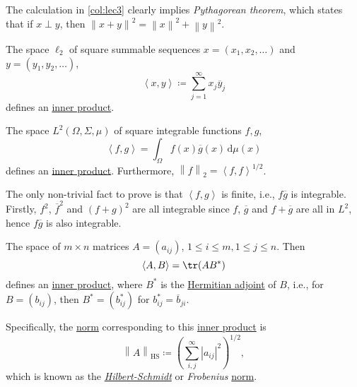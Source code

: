 \begin{remark}\label{rmk:Pythagorean-theorem}
	The calculation in \autoref{col:lec3} clearly implies \emph{Pythagorean theorem}, which states that if \(x \perp y\), then \(\left\lVert x + y\right\rVert ^{2} = \left\lVert x\right\rVert ^{2} + \left\lVert y\right\rVert ^{2} \).
\end{remark}

\begin{eg}
	The space \(\ell _2\) of square summable sequences \(x=(x_1, x_2, \ldots  )\) and \(y=(y_1, y_2, \ldots  )\),
	\[
		\left\langle x, y \right\rangle \coloneqq \sum_{j=1}^{\infty} x_j \overline{y} _j
	\]
	defines an \hyperref[def:inner-product]{inner product}.
\end{eg}

\begin{eg}
	The space \(L^2(\Omega , \Sigma , \mu )\) of square integrable functions \(f, g\),
	\[
		\left\langle f, g \right\rangle = \int _\Omega f(x) \overline{g} (x)\,\mathrm{d} \mu (x)
	\]
	defines an \hyperref[def:inner-product]{inner product}. Furthermore, \(\left\lVert f\right\rVert _2 = \left\langle f, f \right\rangle ^{1 / 2}\).
\end{eg}
\begin{explanation}
	The only non-trivial fact to prove is that \(\left\langle f, g \right\rangle \) is finite, i.e., \(f \overline{g} \) is integrable. Firstly, \(f^{2} \), \(\overline{f} ^{2} \) and \((f + g)^{2} \) are all integrable since \(f\), \(\overline{g} \) and \(f+\overline{g} \) are all in \(L^2\), hence \(f \overline{g} \) is also integrable.
\end{explanation}

\begin{eg}
	The space of \(m \times n\) matrices \(A = (a_{ij} )\), \(1 \leq i\leq m, 1 \leq j\leq n\). Then
	\[
		\left\langle A, B \right\rangle = \tr(A B^{\ast})
	\]
	defines an \hyperref[def:inner-product]{inner product}, where \(B^{\ast} \) is the \href{https://en.wikipedia.org/wiki/Hermitian_adjoint}{Hermitian adjoint} of \(B\), i.e., for \(B = (b_{ij})\), then \(B^{\ast} = (b^{\ast} _{ij})\) for \(b^{\ast} _{ij} = \overline{b}_{ji}\).

	\begin{remark}
		Specifically, the \hyperref[def:norm]{norm} corresponding to this \hyperref[def:inner-product]{inner product} is
		\[
			\left\lVert A\right\rVert _{\mathrm{HS} }\coloneqq \left(\sum_{i, j}^{\infty} \left\vert a_{ij}  \right\vert ^{2} \right)^{1 / 2},
		\]
		which is known as the \href{https://en.wikipedia.org/wiki/Hilbert%E2%80%93Schmidt_operator}{\emph{Hilbert-Schmidt}} or \emph{Frobenius} \hyperref[def:norm]{norm}.
	\end{remark}
\end{eg}

